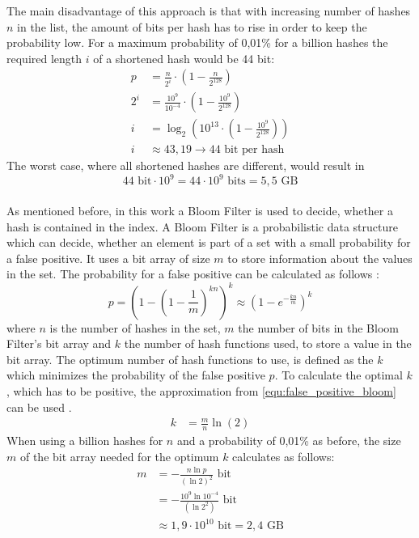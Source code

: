 The main disadvantage of this approach is that with increasing number of hashes $n$ in the list, the amount of bits per hash has to rise in order to keep the probability low.
For a maximum probability of 0,01\% for a billion hashes the required length $i$ of a shortened hash would be 44 bit:
\begin{equation}
	\begin{split}
		p&=\frac{n}{2^i}\cdot \left(1- \frac{n}{2^{128}}\right) \\[10pt]
		2^i&=\frac{10^9}{10^{-4}}\cdot \left(1- \frac{10^9}{2^{128}}\right) \\[10pt]
		i&=\log_2\left(10^{13}\cdot \left(1- \frac{10^9}{2^{128}}\right)\right) \\[10pt]
		i&\approx 43,19 \rightarrow 44 \text{ bit per hash}
	\end{split}
\end{equation}
The worst case, where all shortened hashes are different, would result in 
\begin{equation}
	44\text{ bit} \cdot 10^9 = 44\cdot10^9 \text{ bits} = 5,5 \text{ GB}
\end{equation}
\\
As mentioned before, in this work a Bloom Filter is used to decide, whether a hash is contained in the index.
A Bloom Filter is a probabilistic data structure which can decide, whether an element is part of a set with a small probability for a false positive.
It uses a bit array of size $m$ to store information about the values in the set.
The probability for a false positive can be calculated as follows \cite{fan2000summary}:
\begin{equation}\label{equ:false_positive_bloom}
	p=\left(1-\left(1-\frac{1}{m}\right)^{kn}\right)^k \approx \left(1-e^{-\frac{kn}{m}}\right)^k
\end{equation}
where $n$ is the number of hashes in the set, $m$ the number of bits in the Bloom Filter's bit array and $k$ the number of hash functions used, to store a value in the bit array.
The optimum number of hash functions to use, is defined as the $k$ which minimizes the probability of the false positive $p$.
To calculate the optimal $k$, which has to be positive, the approximation from \autoref{equ:false_positive_bloom} can be used \cite{wiki2018bloom}.
\begin{equation}
	\begin{split}
		k&=\frac{m}{n}\ln(2)
	\end{split}
\end{equation}
When using a billion hashes for $n$ and a probability of 0,01\% as before, the size $m$ of the bit array needed for the optimum $k$ calculates as follows:
\begin{equation}
	\begin{split}
		m&=-\frac{n\ln p}{(\ln2)^2} \text{ bit} \\[10pt]
		&=-\frac{10^9\ln10^{-4}}{(\ln2^2)} \text{ bit} \\[10pt]
		&\approx 1,9\cdot10^{10} \text{ bit}=2,4\text{ GB}
	\end{split}
\end{equation}

